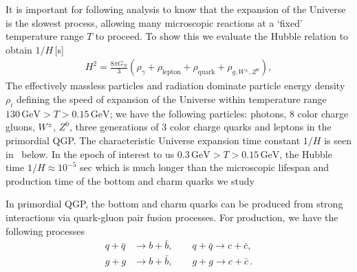 It is important for following analysis to know that the expansion of the Universe is the slowest process, allowing many microscopic reactions at a `fixed' temperature range $T$ to proceed. To show this we evaluate the Hubble relation to obtain $1/H$\,[s]
\begin{align}
H^2=\frac{8\pi G_N}{3}\left(\rho_\gamma+\rho_{\mathrm{lepton}}+\rho_{\mathrm{quark}}+\rho_{g,{W^\pm},{Z^0}}\right),
\end{align}
The effectively massless particles and radiation dominate particle energy density $\rho_i$ defining the speed of expansion of the Universe within  temperature range $130\, \mathrm{GeV}>T>0.15\,\mathrm{GeV}$; we have the following particles: photons, $8$ color charge gluons, $W^\pm$, $Z^0$, three generations of $3$ color charge quarks and leptons in the primordial QGP. The characteristic Universe expansion time constant $1/H$ is seen in~ below. In the epoch of interest to us $0.3\,\mathrm{GeV}>T>0.15\,\mathrm{GeV}$, the Hubble time $1/H\approx10^{-5}$ sec which is much longer than the microscopic lifespan and production time of the bottom and charm quarks we study 

In primordial QGP, the bottom and charm quarks can be produced from strong interactions via quark-gluon pair fusion processes. For production, we have the following processes
\begin{align}
 q+\bar{q}&\longrightarrow b+\bar b,\qquad q+\bar{q}\longrightarrow c+\bar c,\\
 g+g&\longrightarrow b+\bar b,\qquad g+g\longrightarrow c+\bar c\,.
\end{align}

